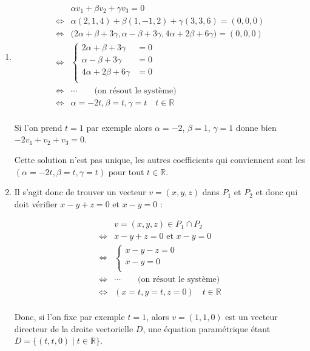 \documentclass[11pt,a4paper]{article}
\newcommand{\Rr}{\mathbb{R}} \newcommand{\R}{\mathbb{R}}
\begin{document}
\begin{enumerate}
  \item 
\begin{align*}
     & \alpha v_1 + \beta v_2 + \gamma v_3 = 0 \\ 
\iff & \alpha (2,1,4) + \beta (1,-1,2) + \gamma (3,3,6) = (0,0,0) \\
\iff &  \Big(2\alpha+\beta+3\gamma,\alpha-\beta+3\gamma,4\alpha+2\beta+6\gamma\Big) = (0,0,0) \\
\iff &
\begin{cases}
  2\alpha+\beta+3\gamma &= 0 \\
  \alpha-\beta+3\gamma  &= 0 \\
  4\alpha+2\beta+6\gamma &= 0 \\
 \end{cases} \\
\iff & \cdots  \qquad  \text{(on résout le système)} \\
\iff & \alpha=-2t, \beta = t, \gamma = t \quad t \in \Rr \\
\end{align*}  

Si l'on prend $t=1$ par exemple alors $\alpha=-2$, $\beta = 1$, $\gamma = 1$
donne bien $-2v_1+v_2+v_3=0$.

Cette solution n'est pas unique, les autres coefficients qui conviennent sont les 
$(\alpha=-2t, \beta = t, \gamma = t)$ pour tout $t \in \Rr$.

  \item 

Il s'agit donc de trouver un vecteur $v=(x,y,z)$ dans $P_1$ et $P_2$ et donc qui doit vérifier 
$x-y+z=0$ et $x-y=0$ :

\begin{align*}
     & v=(x,y,z) \in P_1 \cap P_2 \\ 
\iff & x-y+z=0 \text{ et } x-y=0 \\
\iff &
\begin{cases}
  x-y-z = 0 \\
  x-y = 0 \\
 \end{cases} \\
\iff & \cdots \qquad  \text{(on résout le système)} \\
\iff & (x=t, y = t, z = 0) \quad t \in \Rr \\
\end{align*}  

Donc, si l'on fixe par exemple $t=1$, alors $v=(1,1,0)$ 
est un vecteur directeur de la droite vectorielle $D$,
une équation paramétrique étant $D=\{(t,t,0) \mid t\in \Rr \}$.
\end{enumerate}
\end{document}
